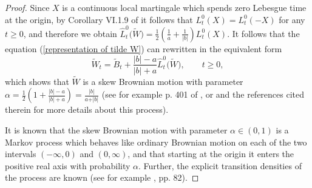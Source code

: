 \documentclass[reqno]{amsart}
\theoremstyle{definition}
\theoremstyle{remark}
\numberwithin{equation}{section}
\begin{document}
\begin{proof}
Since $X$ is a continuous local martingale which spends zero Lebesgue time at the origin, by Corollary VI.1.9 of \cite{Revuz and Yor} it follows that $L_t^0(X)=L_t^0(-X)$ for any $t\ge 0$, and therefore we obtain $\widehat{L}_t^0\big(\widetilde{W}\big)=\frac12\left (\frac1a+\frac{1}{\vert b \vert} \right){L}_t^0(X)$. It follows that the equation (\ref{representation of tilde W}) can rewritten in the equivalent form
\begin{equation}\label{definition of W tilde}
\widetilde{W}_t=\widetilde{B}_t+\frac{\vert b\vert-a}{\vert b\vert+a} \widehat{L}^0_t\big(\widetilde{W}\big), \qquad t\ge 0,
\end{equation}
which shows that $\widetilde{W}$ is a skew Brownian motion with parameter $\alpha = \frac12\left(1+\frac{\vert b \vert-a}{\vert b \vert+a}\right)=\frac{\vert b \vert}{a+\vert b \vert}$ (see for example p. 401 of \cite{Revuz and Yor}, or \cite{Harrison-Shepp} and the references cited therein for more details about this process).

It is known that the skew Brownian motion with parameter $\alpha \in(0,1)$ is a Markov process which behaves like ordinary Brownian motion on each of the two intervals $(-\infty,0)$ and $(0,\infty)$, and that starting at the origin it enters the positive real axis with probability $\alpha$. Further, the explicit transition densities of the process are known (see for example \cite{Revuz and Yor}, pp. 82).



\end{proof}
\end{document}
